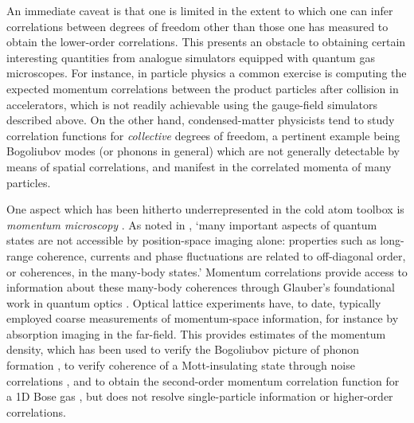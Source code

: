 	An immediate caveat is that one is limited in the extent to which one can infer correlations between degrees of freedom other than those one has measured to obtain the lower-order correlations. 
	This presents an obstacle to obtaining certain interesting quantities from analogue simulators equipped with quantum gas microscopes.
	For instance, in particle physics a common exercise is computing the expected momentum correlations between the product particles after collision in accelerators, which is not readily achievable using the gauge-field simulators described above.
	On the other hand, condensed-matter physicists tend to study correlation functions for \emph{collective} degrees of freedom, a pertinent example being Bogoliubov modes (or phonons in general) which are not generally detectable by means of spatial correlations, and manifest in the correlated momenta of many particles.

	One aspect which has been hitherto underrepresented in the cold atom toolbox is \emph{momentum microscopy} \cite{Ott16}.
	As noted in \cite{Bergschneider18}, `many important aspects of quantum states are not accessible by position-space imaging alone: properties such as long-range coherence, currents and phase fluctuations are related to off-diagonal order, or coherences, in the many-body states.'
	Momentum correlations provide access to information about these many-body coherences through Glauber's foundational work in quantum optics \cite{Glauber63,Naraschewski99}.
	Optical lattice experiments have, to date, typically employed coarse measurements of momentum-space information, for instance by absorption imaging in the far-field.
	This provides estimates of the momentum density, which has been used to verify the Bogoliubov picture of phonon formation \cite{Vogels02}, to verify coherence of a Mott-insulating state through noise correlations \cite{Folling05}, and to obtain the second-order momentum correlation function for a 1D Bose gas \cite{Fang16}, but does not resolve single-particle information or higher-order correlations.
	

